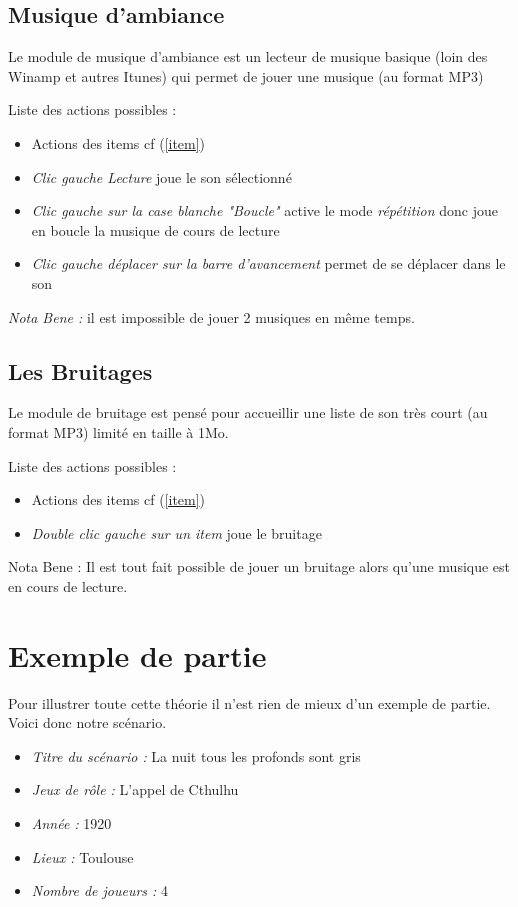 \documentclass[12pt]{article}
\begin{document}
\subsection{Musique d'ambiance}\label{musique}
Le module de musique d'ambiance est un lecteur de musique basique (loin des Winamp et autres Itunes) qui permet de jouer une musique (au format MP3)

Liste des actions possibles :
\begin{itemize}
    \item Actions des items cf (\ref{item})
    \item \emph{Clic gauche Lecture} joue le son sélectionné
    \item \emph{Clic gauche sur la case blanche "Boucle"} active le mode \emph{répétition} donc joue en boucle la musique de cours de lecture
    \item \emph{Clic gauche déplacer sur la barre d'avancement} permet de se déplacer dans le son
\end{itemize}
\emph{Nota Bene :} il est impossible de jouer 2 musiques en même temps.

\subsection{Les Bruitages}\label{bruitage}
Le module de bruitage est pensé pour accueillir une liste de son très court (au format MP3) limité en taille à 1Mo.

Liste des actions possibles :
\begin{itemize}
    \item Actions des items cf (\ref{item})
    \item \emph{Double clic gauche sur un item} joue le bruitage
\end{itemize}

Nota Bene : Il est tout fait possible de jouer un bruitage alors qu'une musique est en cours de lecture.

\section{Exemple de partie}\label{exemple}
Pour illustrer toute cette théorie il n'est rien de mieux d'un exemple de partie.
Voici donc notre scénario.
\begin{itemize}
    \item \emph{Titre du scénario :} La nuit tous les profonds sont gris
    \item \emph{Jeux de rôle :} L'appel de Cthulhu
    \item \emph{Année :} 1920
    \item \emph{Lieux :} Toulouse
    \item \emph{Nombre de joueurs : } 4
\end{itemize}
\end{document}
